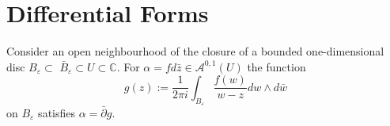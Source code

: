 \section{Differential Forms}
\begin{proposition}
  Consider an open neighbourhood of the closure of a bounded one-dimensional disc $B_{\varepsilon} \subset$ $\bar{B}_{\varepsilon} \subset U \subset \mathbb{C}$. For $\alpha=f d \bar{z} \in \mathcal{A}^{0,1}(U)$ the function
\begin{equation}\label{eq: def function}
g(z):=\frac{1}{2 \pi i} \int_{B_{\varepsilon}} \frac{f(w)}{w-z} d w \wedge d \bar{w}
\end{equation}
on $B_{\varepsilon}$ satisfies $\alpha=\bar{\partial} g$.
\end{proposition}

